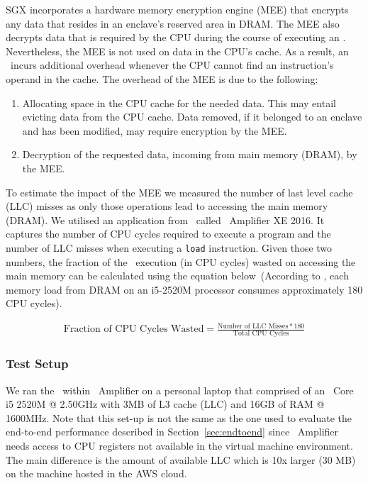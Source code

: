 \documentclass[../../../main.tex]{subfiles}
\begin{document}
\label{sec:mem-analysis}
SGX incorporates a hardware memory encryption engine (MEE) that
encrypts any data that resides in an enclave's reserved area in DRAM.
The MEE also decrypts data that is required by the CPU during the
course of executing an \enclaveprogram. Nevertheless, the MEE is not
used on data in the CPU's cache. As a result, an
\enclaveprogram~incurs additional overhead whenever the CPU cannot
find an instruction's operand in the cache. The overhead of the MEE is
due to the following:
\begin{enumerate}
  \item Allocating space in the CPU cache for the needed data. This
    may entail evicting data from the CPU cache. Data removed, if it
    belonged to an enclave and has been modified, may require encryption
    by the MEE.
  \item Decryption of the requested data, incoming from main memory
    (DRAM), by the MEE.
\end{enumerate}

To estimate the impact of the MEE we measured the number of last level
cache (LLC) misses as only those operations lead to accessing the main
memory (DRAM). We utilised an application from \Intel~called
\VTune~Amplifier XE 2016. It captures the number of CPU cycles
required to execute a program and the number of LLC misses when
executing a \texttt{load} instruction. Given those two numbers, the
fraction of the \enclaveprogram~execution (in CPU cycles) wasted on
accessing the main memory can be calculated using the equation
below~\cite{intel-eqn}(According to \Intel, each memory load from DRAM
on an i5-2520M processor consumes approximately 180 CPU cycles).

\begin{align*}
  \text{Fraction of CPU Cycles Wasted} = 
  \frac{\text{Number of LLC Misses} * 180}
  {\text{Total CPU Cycles}}
\end{align*}


\subsubsection*{Test Setup}
We ran the \enclavemodel~within \VTune~Amplifier on a personal laptop
that comprised of an \Intel~Core i5 2520M @ 2.50GHz with 3MB of L3
cache (LLC) and 16GB of RAM @ 1600MHz. Note that this set-up is not
the same as the one used to evaluate the end-to-end performance
described in Section~\ref{sec:endtoend} since \VTune~Amplifier needs
access to CPU registers not available in the virtual machine
environment. The main difference is the amount of available LLC which
is 10x larger (30 MB) on the machine hosted in the AWS cloud.
\end{document}
